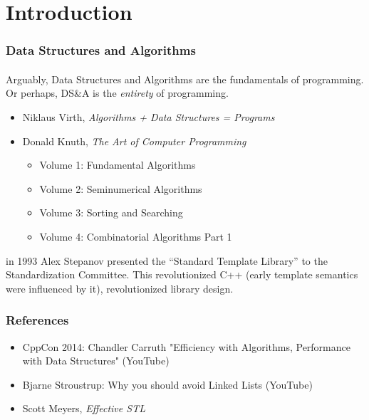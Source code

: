 \section{Introduction}

\begin{frame}[fragile]
\frametitle{Data Structures and Algorithms}
\framesubtitle{}
Arguably, Data Structures and Algorithms are the fundamentals of programming.
Or perhaps, DS&A is the \emph{entirety} of programming.
\begin{itemize}
\item Niklaus Virth, \emph{Algorithms + Data Structures = Programs}
\item Donald Knuth, \emph{The Art of Computer Programming}
\begin{itemize}
  \item Volume 1: Fundamental Algorithms
  \item Volume 2: Seminumerical Algorithms
  \item Volume 3: Sorting and Searching
  \item Volume 4: Combinatorial Algorithms Part 1
\end{itemize}
\end{itemize}

in 1993 Alex Stepanov presented the ``Standard Template Library'' to
the \CC Standardization Committee.  This revolutionized C++ (early
template semantics were influenced by it), revolutionized library
design.

\end{frame}


\begin{frame}[fragile]
\frametitle{References}
\begin{itemize}
\item CppCon 2014: Chandler Carruth "Efficiency with Algorithms,
  Performance with Data Structures" (YouTube)
\item Bjarne Stroustrup: Why you should avoid Linked Lists (YouTube)
\item Scott Meyers, \emph{Effective STL}
\end{itemize}
\end{frame}

